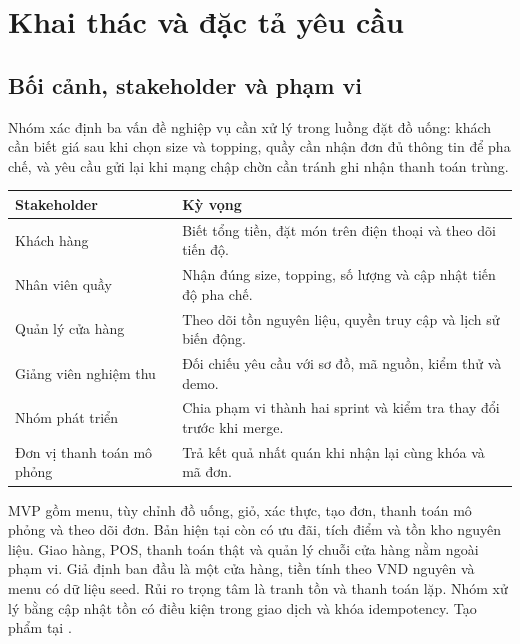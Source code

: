 \documentclass[a4paper]{article}
\begin{document}
\thispagestyle{empty}

\newpage
\renewcommand{\contentsname}{Mục lục}
\tableofcontents
\clearpage


\setlength{\parskip}{5pt}
\setcounter{section}{0}
\renewcommand{\thesection}{Task \arabic{section}}
\renewcommand{\thesubsection}{\arabic{section}.\arabic{subsection}}
\makeatletter
\renewcommand*\l@section{\@dottedtocline{1}{0em}{4.2em}}
\renewcommand*\l@subsection{\@dottedtocline{2}{1.5em}{2.7em}}
\makeatother

\section{Khai thác và đặc tả yêu cầu}

\subsection{Bối cảnh, stakeholder và phạm vi}
Nhóm xác định ba vấn đề nghiệp vụ cần xử lý trong luồng đặt đồ uống: khách cần biết giá sau khi chọn size và topping, quầy cần nhận đơn đủ thông tin để pha chế, và yêu cầu gửi lại khi mạng chập chờn cần tránh ghi nhận thanh toán trùng.

\begin{tabularx}{\linewidth}{@{}p{.31\linewidth}X@{}}
\toprule
\textbf{Stakeholder} & \textbf{Kỳ vọng}\\
\midrule
Khách hàng & Biết tổng tiền, đặt món trên điện thoại và theo dõi tiến độ.\\
Nhân viên quầy & Nhận đúng size, topping, số lượng và cập nhật tiến độ pha chế.\\
Quản lý cửa hàng & Theo dõi tồn nguyên liệu, quyền truy cập và lịch sử biến động.\\
Giảng viên nghiệm thu & Đối chiếu yêu cầu với sơ đồ, mã nguồn, kiểm thử và demo.\\
Nhóm phát triển & Chia phạm vi thành hai sprint và kiểm tra thay đổi trước khi merge.\\
Đơn vị thanh toán mô phỏng & Trả kết quả nhất quán khi nhận lại cùng khóa và mã đơn.\\
\bottomrule
\end{tabularx}

MVP gồm menu, tùy chỉnh đồ uống, giỏ, xác thực, tạo đơn, thanh toán mô phỏng và theo dõi đơn. Bản hiện tại còn có ưu đãi, tích điểm và tồn kho nguyên liệu. Giao hàng, POS, thanh toán thật và quản lý chuỗi cửa hàng nằm ngoài phạm vi. Giả định ban đầu là một cửa hàng, tiền tính theo VND nguyên và menu có dữ liệu seed. Rủi ro trọng tâm là tranh tồn và thanh toán lặp. Nhóm xử lý bằng cập nhật tồn có điều kiện trong giao dịch và khóa idempotency. Tạo phẩm tại .
\end{document}
